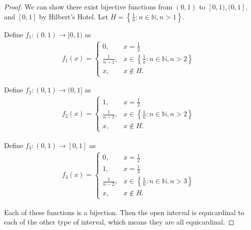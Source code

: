 \documentclass{article}[12pt]
\newcommand{\N}{\mathbb{N}}
\begin{document}
        \begin{proof}
            We can show there exist bijective functions from $(0, 1)$ to $[0, 1), (0, 1],$ and $[0, 1]$ by Hilbert's Hotel. Let $H = \left\{\frac{1}{n} : n \in \N, n > 1 \right\}$.
            
            Define $f_1 : (0, 1) \to [0, 1)$ as
            \begin{align}
                f_1(x) = \begin{cases}
                    0,              & x = \frac{1}{2}
                    \\
                    \frac{1}{n-1},  & x \in \left\{\frac{1}{n} : n \in \N, n > 2\right\}
                    \\
                    x,              & x \not\in H.
                \end{cases}
            \end{align}
            
            Define $f_2 : (0, 1) \to (0, 1]$ as
            \begin{align}
                f_2(x) = \begin{cases}
                    1,              & x = \frac{1}{2}
                    \\
                    \frac{1}{n-1},  & x \in \left\{\frac{1}{n} : n \in \N, n > 2\right\}
                    \\
                    x,              & x \not\in H.
                \end{cases}
            \end{align}
            
            Define $f_3 : (0, 1) \to [0, 1]$ as
            \begin{align}
                f_3(x) = \begin{cases}
                    0,              & x = \frac{1}{2}
                    \\
                    1,              & x = \frac{1}{3}
                    \\
                    \frac{1}{n-2},  & x \in \left\{\frac{1}{n} : n \in \N, n > 3\right\}
                    \\
                    x,              & x \not\in H.
                \end{cases}
            \end{align}
            
        Each of these functions is a bijection. Then the open interval is equicardinal to each of the other type of interval, which means they are all equicardinal.
    \end{proof}
\end{document}
